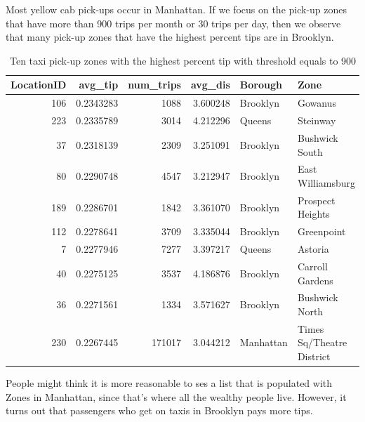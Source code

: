 \documentclass[12pt,twoside]{reedthesis}
\newenvironment{Shaded}{\begin{snugshade}}{\end{snugshade}}
\newcommand{\KeywordTok}[1]{\textcolor[rgb]{0.13,0.29,0.53}{\textbf{#1}}}
\newcommand{\DataTypeTok}[1]{\textcolor[rgb]{0.13,0.29,0.53}{#1}}
\newcommand{\DecValTok}[1]{\textcolor[rgb]{0.00,0.00,0.81}{#1}}
\newcommand{\StringTok}[1]{\textcolor[rgb]{0.31,0.60,0.02}{#1}}
\newcommand{\CommentTok}[1]{\textcolor[rgb]{0.56,0.35,0.01}{\textit{#1}}}
\newcommand{\OperatorTok}[1]{\textcolor[rgb]{0.81,0.36,0.00}{\textbf{#1}}}
\newcommand{\NormalTok}[1]{#1}
\theoremstyle{definition}
\theoremstyle{definition}
\theoremstyle{definition}
\theoremstyle{remark}
\begin{document}
Most yellow cab pick-ups occur in Manhattan. If we focus on the pick-up
zones that have more than 900 trips per month or 30 trips per day, then
we observe that many pick-up zones that have the highest percent tips
are in Brooklyn.
\begin{Shaded}
\end{Shaded}
\begin{table}

\caption{\label{tab:unnamed-chunk-15}Ten taxi pick-up zones with the highest percent tip with threshold equals to 900}
\centering
\begin{tabular}[t]{r|r|r|r|l|l}
\hline
LocationID & avg\_tip & num\_trips & avg\_dis & Borough & Zone\\
\hline
106 & 0.2343283 & 1088 & 3.600248 & Brooklyn & Gowanus\\
\hline
223 & 0.2335789 & 3014 & 4.212296 & Queens & Steinway\\
\hline
37 & 0.2318139 & 2309 & 3.251091 & Brooklyn & Bushwick South\\
\hline
80 & 0.2290748 & 4547 & 3.212947 & Brooklyn & East Williamsburg\\
\hline
189 & 0.2286701 & 1842 & 3.361070 & Brooklyn & Prospect Heights\\
\hline
112 & 0.2278641 & 3709 & 3.335044 & Brooklyn & Greenpoint\\
\hline
7 & 0.2277946 & 7277 & 3.397217 & Queens & Astoria\\
\hline
40 & 0.2275125 & 3537 & 4.186876 & Brooklyn & Carroll Gardens\\
\hline
36 & 0.2271561 & 1334 & 3.571627 & Brooklyn & Bushwick North\\
\hline
230 & 0.2267445 & 171017 & 3.044212 & Manhattan & Times Sq/Theatre District\\
\hline
\end{tabular}
\end{table}
People might think it is more reasonable to ses a list that is populated
with Zones in Manhattan, since that's where all the wealthy people live.
However, it turns out that passengers who get on taxis in Brooklyn pays
more tips.
\end{document}
